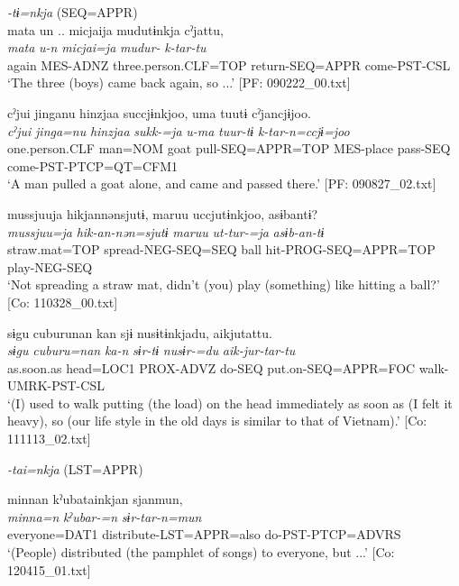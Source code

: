 \ea\label{ex:10.26}   
 \begin{xlist}
 \exi{} \textit{{}-tɨ=nkja} (SEQ=APPR)\\
  \ex  %
      \glll    mata  un ..  micjaija  mudutɨnkja  cˀjattu,\\
      \textit{mata}  \textit{u-n}  \textit{micjai=ja}  \textit{mudur-}  \textit{k-tar-tu}\\
      again  MES-ADNZ  three.person.CLF=TOP  return-SEQ=APPR  come-PST{}-CSL\\
      \glt       ‘The three (boys) came back again, so ...’ [PF: 090222\_00.txt]

  \ex  %
      \glll    cˀjui  jinganu  hinzjaa  succjɨnkjoo,  uma   tuutɨ  cˀjancjɨjoo.\\
      \textit{cˀjui}  \textit{jinga=nu}  \textit{hinzjaa}  \textit{sukk-=ja}  \textit{u-ma}  \textit{tuur-tɨ}  \textit{k-tar-n=ccjɨ=joo}\\
      one.person.CLF  man=NOM  goat  pull-SEQ=APPR=TOP  MES-place  pass-SEQ  come-PST-PTCP=QT=CFM1\\
      \glt       ‘A man pulled a goat alone, and came and passed there.’ [PF: 090827\_02.txt]

  \ex  %
      \glll    mussjuuja  hikjannənsjutɨ,  maruu  uccjutɨnkjoo,   asɨbantɨ?      \\
      \textit{mussjuu=ja}  \textit{hik-an-nən=sjutɨ}  \textit{maruu}  \textit{ut-tur-=ja} \textit{asɨb-an-tɨ}\\
      straw.mat=TOP  spread-NEG-SEQ=SEQ  ball  hit-PROG-SEQ=APPR=TOP  play-NEG-SEQ      \\
      \glt       ‘Not spreading a straw mat, didn’t (you) play (something) like hitting a ball?’ [Co: 110328\_00.txt]

  \ex  %
      \glll    sɨgu  cuburunan  kan  sjɨ  nusɨtɨnkjadu, aikjutattu.\\
      \textit{sɨgu}  \textit{cuburu=nan}  \textit{ka-n}  \textit{sɨr-tɨ}  \textit{nusɨr-=du}  \textit{aik-jur-tar-tu}\\
      as.soon.as  head=LOC1  PROX-ADVZ  do-SEQ  put.on-SEQ=APPR=FOC   walk-UMRK-PST-CSL\\
      \glt       ‘(I) used to walk putting (the load) on the head immediately as soon as (I felt it heavy), so (our life style in the old days is similar to that of Vietnam).’ [Co: 111113\_02.txt]

  \exi{} \textit{{}-tai=nkja} (LST=APPR)

  \ex  %
      \glll    minnan  kˀubatainkjan  sjanmun,\\
      \textit{minna=n}  \textit{kˀubar-=n}  \textit{sɨr-tar-n=mun}\\
      everyone=DAT1  distribute-LST=APPR=also  do-PST-PTCP=ADVRS\\
      \glt       ‘(People) distributed (the pamphlet of songs) to everyone, but ...’ [Co: 120415\_01.txt]
  \end{xlist}
\z

